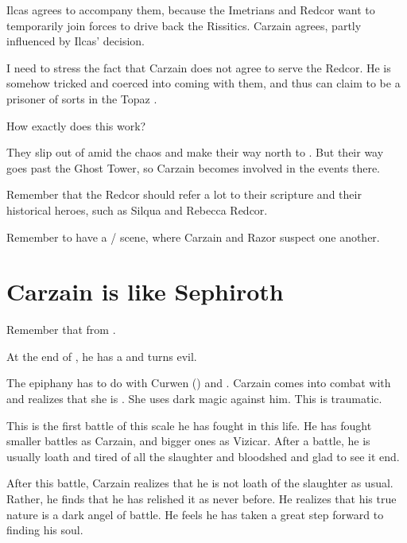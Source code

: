 Ilcas agrees to accompany them, because the Imetrians and Redcor want to temporarily join forces to drive back the Rissitics. Carzain agrees, partly influenced by Ilcas' decision. 

I need to stress the fact that Carzain does not agree to serve the Redcor. He is somehow tricked and coerced into coming with them, and thus can claim to be a prisoner of sorts in the Topaz \Chateau. 

How exactly does this work?

They slip out of \Forclin{} amid the chaos and make their way north to \Redce{}. 
But their way goes past the Ghost Tower, so Carzain becomes involved in the events there. 

Remember that the Redcor should refer a lot to their scripture and their historical heroes, such as Silqua and Rebecca Redcor. 

Remember to have a / scene, where Carzain and Razor suspect one another.





\section{Carzain is like Sephiroth}
Remember that  from \cite{VideoGame:FinalFantasyVII}. 

At the end of \TwilightAngelRememberEmph, he has a  and turns evil. 

The epiphany has to do with Curwen () and \Takestsha.
Carzain comes into combat with \Takestsha and realizes that she is \Nzessuacrith. 
She uses dark magic against him. 
This is traumatic. 

This is the first battle of this scale he has fought in this life.
He has fought smaller battles as Carzain, and bigger ones as Vizicar.
After a battle, he is usually loath and tired of all the slaughter and bloodshed and glad to see it end. 

After this battle, Carzain realizes that he is not loath of the slaughter as usual.
Rather, he finds that he has relished it as never before. 
He realizes that his true nature is a dark angel of battle.
He feels he has taken a great step forward to finding his soul. 





